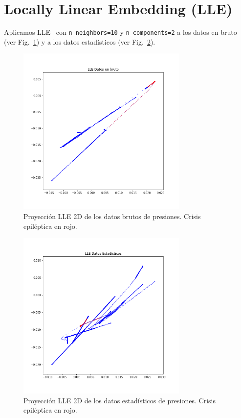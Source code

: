 \documentclass[a4paper,12pt,twoside,oldfontcommands]{memoir}
\begin{document}
\section{Locally Linear Embedding (LLE)}
Aplicamos LLE~\cite{roweis2000nonlinear} con \texttt{n\_neighbors=10} y \texttt{n\_components=2} a los datos en bruto (ver Fig.~\ref{fig:lleDB}) y a los datos estadísticos (ver Fig.~\ref{fig:lleDE}).
\begin{figure}
    \centering
    \includegraphics[width=0.75\textwidth]{images/lleDB.png}
    \caption{Proyección LLE 2D de los datos brutos de presiones. Crisis epiléptica en rojo.}
    \label{fig:lleDB}
\end{figure}
\begin{figure}
    \centering
    \includegraphics[width=0.75\textwidth]{images/lleDE.png}
    \caption{Proyección LLE 2D de los datos estadísticos de presiones. Crisis epiléptica en rojo.}
    \label{fig:lleDE}
\end{figure}
\end{document}
